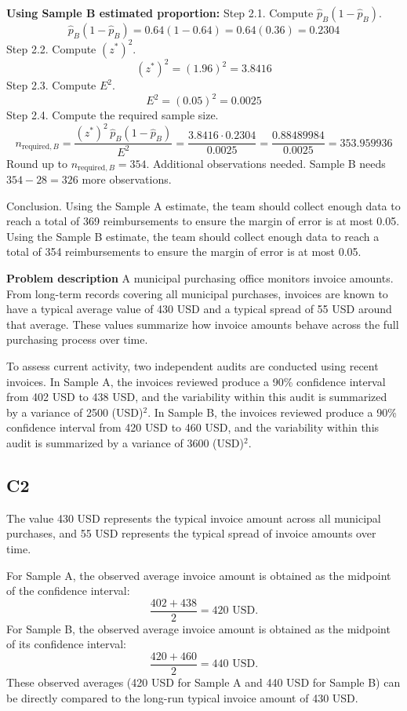 \begin{ExamProblems}
		\textbf{Using Sample B estimated proportion:}
		Step 2.1.
		Compute $\hat{p}_B(1-\hat{p}_B)$.
		\[
		\hat{p}_B(1-\hat{p}_B) = 0.64(1-0.64) = 0.64(0.36) = 0.2304
		\]
		Step 2.2.
		Compute $(z^*)^2$.
		\[
		(z^*)^2 = (1.96)^2 = 3.8416
		\]
		Step 2.3.
		Compute $E^2$.
		\[
		E^2 = (0.05)^2 = 0.0025
		\]
		Step 2.4.
		Compute the required sample size.
		\[
		n_{\text{required},B} = \frac{(z^*)^2\,\hat{p}_B(1-\hat{p}_B)}{E^2}
		= \frac{3.8416 \cdot 0.2304}{0.0025}
		= \frac{0.88489984}{0.0025}
		= 353.959936
		\]
		Round up to $n_{\text{required},B} = 354$.
		Additional observations needed.
		Sample B needs $354 - 28 = 326$ more observations.
		
		Conclusion.
		Using the Sample A estimate, the team should collect enough data to reach a total of 369 reimbursements to ensure the margin of error is at most 0.05.
		Using the Sample B estimate, the team should collect enough data to reach a total of 354 reimbursements to ensure the margin of error is at most 0.05.
		
		\newpage
		\item
		\textbf{Problem description}
		A municipal purchasing office monitors invoice amounts. From long-term records covering all municipal purchases, invoices are known to have a typical average value of 430 USD and a typical spread of 55 USD around that average. These values summarize how invoice amounts behave across the full purchasing process over time.
		
		To assess current activity, two independent audits are conducted using recent invoices. In Sample A, the invoices reviewed produce a 90\% confidence interval from 402 USD to 438 USD, and the variability within this audit is summarized by a variance of 2500 (USD)$^2$. In Sample B, the invoices reviewed produce a 90\% confidence interval from 420 USD to 460 USD, and the variability within this audit is summarized by a variance of 3600 (USD)$^2$.
		
		\subsection*{C2}
		The value 430 USD represents the typical invoice amount across all municipal purchases, and 55 USD represents the typical spread of invoice amounts over time.
		
		For Sample A, the observed average invoice amount is obtained as the midpoint of the confidence interval:
		\[
		\frac{402 + 438}{2} = 420 \text{ USD}.
		\]
		For Sample B, the observed average invoice amount is obtained as the midpoint of its confidence interval:
		\[
		\frac{420 + 460}{2} = 440 \text{ USD}.
		\]
		These observed averages (420 USD for Sample A and 440 USD for Sample B) can be directly compared to the long-run typical invoice amount of 430 USD.
		

\end{ExamProblems}
